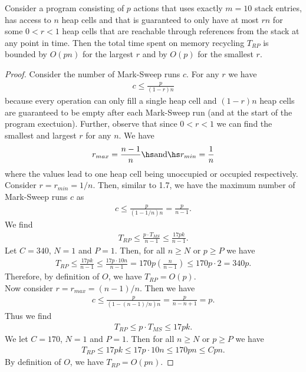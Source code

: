 \documentclass{article}
\begin{document}
\begin{claim}
    Consider a program consisting of $p$ actions that uses exactly $m=10$
    stack entries, has access to $n$ heap cells and that is guaranteed to only
    have at most $rn$ for some $0<r<1$ heap cells that are reachable through references
    from the stack at any point in time.
    Then the total time spent on memory recycling $T_{RP}$ is bounded by $O(pn)$ for
    the largest $r$ and by $O(p)$ for the smallest $r$.
\end{claim}

\begin{proof}
    Consider the number of Mark-Sweep runs $c$. For any $r$ we have
    \begin{align*}
        c \leq \frac{p}{(1-r)n}
    \end{align*}
    because every operation can only fill a single heap cell and $(1-r)n$ heap cells 
    are guaranteed to be empty after each Mark-Sweep run (and at the start of the
    program exectuion).
    Further, observe that since $0<r<1$ we can find the smallest and largest $r$ for any $n$. We have
    \begin{align}
        \label{rlims}
        r_{max} = \frac{n-1}{n} \hs\text{and}\hs r_{min} = \frac{1}{n}
    \end{align}
    where the values lead to one heap cell being unoccupied or occupied respectively.\\
    Consider $r=r_{min}=1/n$. Then, similar to 1.7, we have the maximum number of Mark-Sweep
    runs $c$ as
    \begin{align*}
        c \leq \frac{p}{\left(1-1/n\right)n}=\frac{p}{n-1}.
    \end{align*}
    We find
    \begin{align*}
        T_{RP} \leq \frac{p\cdot T_{MS}}{n-1} \leq \frac{17pk}{n-1}.
    \end{align*}
    Let $C=340$, $N=1$ and $P=1$. Then, for all $n\geq N$ or $p\geq P$ we have
    \begin{align*}
        T_{RP} \leq \frac{17pk}{n-1} \leq \frac{17p\cdot 10n}{n-1} = 170p\left(\frac{n}{n-1}\right)
        \leq 170p\cdot 2 = 340p.
    \end{align*}
    Therefore, by definition of $O$, we have $T_{RP}=O(p)$.\\
    Now consider $r=r_{max}=(n-1)/n$. Then we have
    \begin{align}
        \label{cmax}
        c\leq \frac{p}{(1-(n-1)/n)n} = \frac{p}{n-n+1} = p.
    \end{align}
    Thus we find
    \begin{align*}
        T_{RP} \leq p\cdot T_{MS} \leq 17pk.
    \end{align*}
    We let $C=170$, $N=1$ and $P=1$. Then for all $n\geq N$ or $p\geq P$ we have
    \begin{align*}
        T_{RP} \leq 17pk \leq 17p \cdot 10n \leq 170pn \leq Cpn.
    \end{align*}
    By definition of $O$, we have $T_{RP}=O(pn)$. 
\end{proof}
\end{document}
